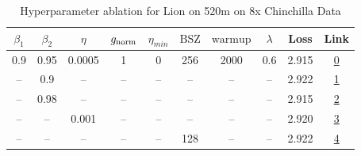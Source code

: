 \begin{table}[H]
\centering
\caption{Hyperparameter ablation for Lion on 520m on 8x Chinchilla Data}
\label{tab:ablation_lion_520m_on_8x_chinchilla_data}
\begin{tabular}{cccccccccc}
\toprule
$\beta_1$ & $\beta_2$ & $\eta$ & $g_{\mathrm{norm}}$ & $\eta_{min}$ & $\mathrm{BSZ}$ & $\mathrm{warmup}$ & $\lambda$ & Loss & Link \\
\midrule
0.9 & 0.95 & 0.0005 & 1 & 0 & 256 & 2000 & 0.6 & 2.915 & \href{https://wandb.ai/marin-community/optimizer-scaling/runs/sweep-520m-85B-lionf86a38lr0.0005-wd0.6-minlr0-warmup2000-b10.9--54ea21}{0} \\
\midrule
-- & 0.9 & -- & -- & -- & -- & -- & -- & 2.922 & \href{https://wandb.ai/marin-community/optimizer-scaling/runs/sweep-520m-85B-lion75027blr0.0005-wd0.6-minlr0-warmup2000-b10.9--094576}{1} \\
-- & 0.98 & -- & -- & -- & -- & -- & -- & 2.915 & \href{https://wandb.ai/marin-community/optimizer-scaling/runs/sweep-520m-85B-lion1c2a3blr0.0005-wd0.6-minlr0-warmup2000-b10.9--fdc97c}{2} \\
-- & -- & 0.001 & -- & -- & -- & -- & -- & 2.920 & \href{https://wandb.ai/marin-community/optimizer-scaling/runs/sweep-520m-85B-lion2b623elr0.001-wd0.6-minlr0-warmup2000-b10.9-b-a6a1ef}{3} \\
-- & -- & -- & -- & -- & 128 & -- & -- & 2.922 & \href{https://wandb.ai/marin-community/optimizer-scaling/runs/sweep-520m-85B-liond118d4lr0.0005-wd0.6-minlr0-warmup2000-b10.9--8f527b}{4} \\
\bottomrule
\end{tabular}
\end{table}

